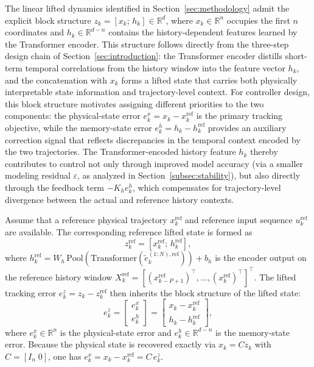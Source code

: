 \documentclass[journal]{IEEEtran}
\begin{document}
The linear lifted dynamics identified in Section~\ref{sec:methodology} admit the explicit block structure $z_k = [x_k;\, h_k] \in \mathbb{R}^d$, where $x_k \in \mathbb{R}^n$ occupies the first $n$ coordinates and $h_k \in \mathbb{R}^{d-n}$ contains the history-dependent features learned by the Transformer encoder. This structure follows directly from the three-step design chain of Section~\ref{sec:introduction}: the Transformer encoder distills short-term temporal correlations from the history window into the feature vector $h_k$, and the concatenation with $x_k$ forms a lifted state that carries both physically interpretable state information and trajectory-level context. For controller design, this block structure motivates assigning different priorities to the two components: the physical-state error $e_k^x = x_k - x_k^{\mathrm{ref}}$ is the primary tracking objective, while the memory-state error $e_k^h = h_k - h_k^{\mathrm{ref}}$ provides an auxiliary correction signal that reflects discrepancies in the temporal context encoded by the two trajectories. The Transformer-encoded history feature $h_k$ thereby contributes to control not only through improved model accuracy (via a smaller modeling residual $\varepsilon$, as analyzed in Section~\ref{subsec:stability}), but also directly through the feedback term $-K_h e_k^h$, which compensates for trajectory-level divergence between the actual and reference history contexts.

Assume that a reference physical trajectory $x_k^{\mathrm{ref}}$ and reference input sequence $u_k^{\mathrm{ref}}$ are available. The corresponding reference lifted state is formed as
\begin{equation}
    z_k^{\mathrm{ref}} = [x_k^{\mathrm{ref}};\, h_k^{\mathrm{ref}}],
    \label{eq:ref_lifted}
\end{equation}
where $h_k^{\mathrm{ref}} = W_h\,\mathrm{Pool}\!\left(\mathrm{Transformer}(\tilde{e}^{(1:N),\mathrm{ref}}_k)\right) + b_h$ is the encoder output on the reference history window $X_k^{\mathrm{ref}} = [(x_{k-P+1}^{\mathrm{ref}})^\top,\ldots,(x_k^{\mathrm{ref}})^\top]^\top$. The lifted tracking error $e_k^z = z_k - z_k^{\mathrm{ref}}$ then inherits the block structure of the lifted state:
\begin{equation}
    e_k^z = \begin{bmatrix} e_k^x \\ e_k^h \end{bmatrix}
           = \begin{bmatrix} x_k - x_k^{\mathrm{ref}} \\ h_k - h_k^{\mathrm{ref}} \end{bmatrix},
    \label{eq:structured_error}
\end{equation}
where $e_k^x \in \mathbb{R}^n$ is the physical-state error and $e_k^h \in \mathbb{R}^{d-n}$ is the memory-state error. Because the physical state is recovered exactly via $x_k = Cz_k$ with $C=[I_n\;0]$, one has $e_k^x = x_k - x_k^{\mathrm{ref}} = C\,e_k^z$.
\end{document}
